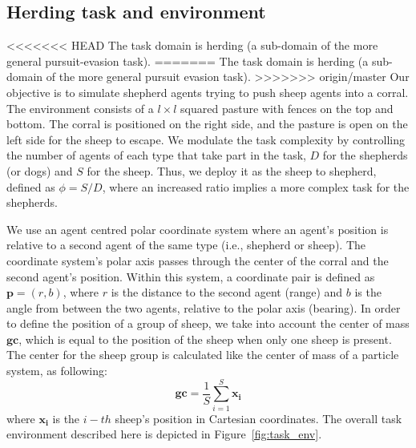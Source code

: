 \documentclass[conference]{IEEEtran}
\begin{document}
\subsection{Herding task and environment}
\label{sec:herding_task_environment}
<<<<<<< HEAD
The task domain is herding (a sub-domain of the more general pursuit-evasion task).
=======
The task domain is herding (a sub-domain of the more general pursuit evasion task).
>>>>>>> origin/master
Our objective is to simulate shepherd agents trying to push sheep agents into a corral. 
The environment consists of a $l \times l$ squared pasture with fences on the top and bottom.
The corral is positioned on the right side, and the pasture is open on the left side for the sheep to escape.
We modulate the task complexity by controlling the number of agents of each type that take part in the task, $D$ for the shepherds (or dogs) and $S$ for the sheep.
Thus, we deploy it as the sheep to shepherd, defined as $\phi = S / D$, where an increased ratio implies a more complex task for the shepherds.

We use an agent centred polar coordinate system where an agent's position is relative to a second agent of the same type (i.e., shepherd or sheep).
The coordinate system's polar axis passes through the center of the corral and the second agent's position. 
Within this system, a coordinate pair is defined as $\mathbf{p} = (r, b)$, where $r$ is the distance to the second agent (range) and $b$ is the angle from between the two agents, relative to the polar axis (bearing).
In order to define the position of a group of sheep, we take into account the center of mass $\mathbf{gc}$, which is equal to the position of the sheep when only one sheep is present.
The center for the sheep group is calculated like the center of mass of a particle system, as following:
\begin{equation} \label{eq:gc}
\mathbf{gc} = \frac{1}{S} \sum_{i=1}^{S}{\mathbf{x_i}}
\end{equation}
where $\mathbf{x_i}$ is the $i-th$ sheep's position in Cartesian coordinates.
The overall task environment described here is depicted in Figure~\ref{fig:task_env}. 
\end{document}
